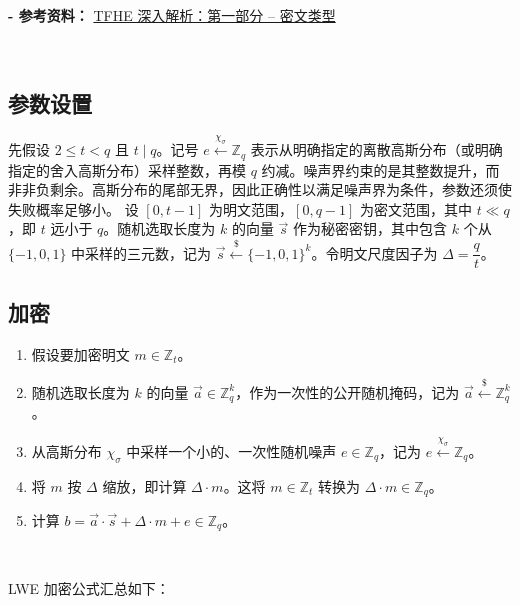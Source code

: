 
\textbf{- 参考资料：}
\href{https://www.zama.ai/post/tfhe-deep-dive-part-1}{TFHE 深入解析：第一部分 -- 密文类型}~\cite{tfhe-1}



$ $




\subsection{参数设置}

先假设 $2\le t<q$ 且 $t\mid q$。记号 $e\xleftarrow{\chi_\sigma}\mathbb Z_q$ 表示从明确指定的离散高斯分布（或明确指定的舍入高斯分布）采样整数，再模 $q$ 约减。噪声界约束的是其整数提升，而非非负剩余。高斯分布的尾部无界，因此正确性以满足噪声界为条件，参数还须使失败概率足够小。
设 $[0, t-1]$ 为明文范围，$[0, q-1]$ 为密文范围，其中 $t \ll q$，即 $t$ 远小于 $q$。随机选取长度为 $k$ 的向量 $\vec{s}$ 作为秘密密钥，其中包含 $k$ 个从 $\{-1, 0, 1\}$ 中采样的三元数，记为 $\vec{s} \xleftarrow{\$} \{-1, 0, 1\}^k$。令明文尺度因子为 $\Delta = \dfrac{q}{t}$。

\subsection{加密}
\label{subsec:lwe-enc}

\begin{enumerate}
\item 假设要加密明文 $m \in \mathbb{Z}_t$。\item 随机选取长度为 $k$ 的向量 $\vec{a} \in \mathbb{Z}_q^k$，作为一次性的公开随机掩码，记为 $\vec{a} \xleftarrow{\$} \mathbb{Z}_q^k$。
\item 从高斯分布 $\chi_\sigma$ 中采样一个小的、一次性随机噪声 $e \in \mathbb{Z}_q$，记为 $e \xleftarrow{\chi_\sigma} \mathbb{Z}_q$。
\item 将 $m$ 按 $\Delta$ 缩放，即计算 $\Delta \cdot m$。这将 $m \in \mathbb{Z}_t$ 转换为 $\Delta \cdot m \in \mathbb{Z}_q$。
\item 计算 $b = \vec{a} \cdot \vec{s} + \Delta \cdot m + e \in \mathbb{Z}_q$。
\end{enumerate}

$ $

LWE 加密公式汇总如下：

$ $

